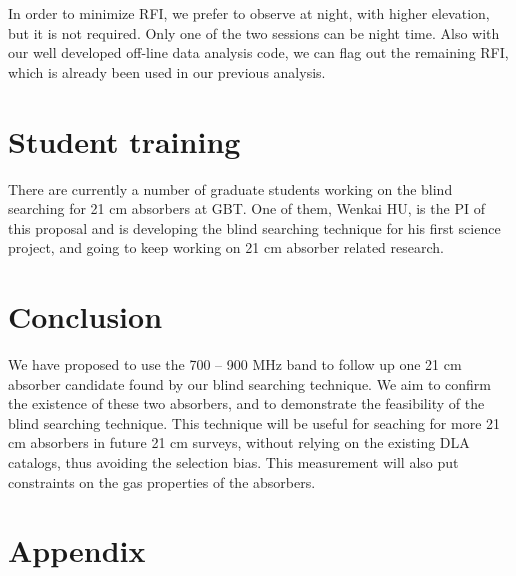 \documentclass[prl,twocolumn,floatfix,superscriptaddress,nofootinbib,aps]{revtex4}
\begin{document}
In order to minimize RFI, we prefer to observe at night, with higher elevation, but it is not required. Only one of the two sessions can be night time.
Also with our well developed off-line data analysis code, we can flag out 
the remaining RFI, which is already been used in our previous analysis.

\section{Student training}
There are currently a number of graduate students working on the blind searching 
for 21 cm absorbers at GBT.  One of them, Wenkai HU, is the PI of this proposal and is developing 
the blind searching technique for his first science project, and going to 
keep working on 21 cm absorber related research. 

\section{Conclusion}
We have proposed to use the 700 -- 900 MHz band to follow up 
one 21 cm absorber candidate found by our blind searching technique. 
We aim to confirm the existence of these two absorbers, and to demonstrate 
the feasibility of the blind searching technique. This technique will 
be useful for seaching for more 21 cm absorbers in future
21 cm surveys, without relying on the existing DLA catalogs, 
thus avoiding the selection bias. This measurement
will also put constraints on the gas properties of the absorbers.




\section{Appendix}
\end{document}

